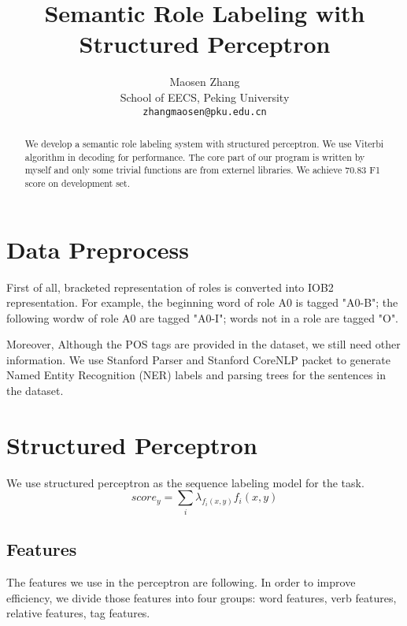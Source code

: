 \documentclass[11pt,a4paper]{article}
\title{Semantic Role Labeling with Structured Perceptron}
\author{Maosen Zhang \\
  School of EECS, Peking University \\
  {\tt zhangmaosen@pku.edu.cn} \\}
\date{}
\begin{document}
\maketitle
\begin{abstract}
  We develop a semantic role labeling system with structured perceptron. \cite{collins2002discriminative}
  We use Viterbi algorithm in decoding for performance. The core part of 
  our program is written by myself and only some trivial functions are 
  from externel libraries. We achieve 70.83 F1 score on development set.
\end{abstract}

\section{Data Preprocess}
First of all, bracketed representation of roles is converted into IOB2 representation.
For example, the beginning word of role A0 is tagged "A0-B"; 
the following wordw of role A0 are tagged "A0-I"; words not in a role are tagged "O".

Moreover, Although the POS tags are provided in the dataset, we still need other 
information. We use Stanford Parser and Stanford CoreNLP packet to 
generate Named Entity Recognition (NER) labels and parsing trees for 
the sentences in the dataset.

\section{Structured Perceptron}
We use structured perceptron as the sequence labeling model for the task.\cite{collins2002discriminative}
$$
score_y = \sum_i \lambda_{f_i(x,y)} f_i(x, y)
$$

\subsection{Features}
The features we use in the perceptron are following. In order to improve efficiency,
we divide those features into four groups: word features, verb features, 
relative features, tag features.
\end{document}
